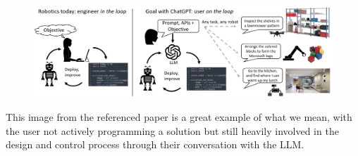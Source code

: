 \documentclass[journal]{IEEEtran}
\begin{document}
\begin{figure}[h]
    \centering
    \includegraphics[width=1\linewidth]{img1.png}
    
    
\end{figure}
This image from the referenced paper is a great example of what we mean, with the user not actively programming a solution but still heavily involved in the design and control process through their conversation with the LLM.
\end{document}
